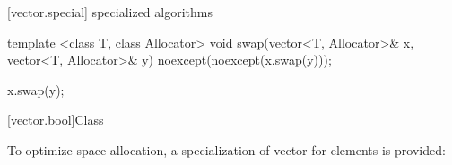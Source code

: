 [vector.special]{ specialized algorithms}

%
%
\begin{itemdecl}
template <class T, class Allocator>
  void swap(vector<T, Allocator>& x, vector<T, Allocator>& y)
    noexcept(noexcept(x.swap(y)));
\end{itemdecl}

\begin{itemdescr}
\pnum
\effects
\begin{codeblock}
x.swap(y);
\end{codeblock}
\end{itemdescr}

[vector.bool]{Class }

\pnum
{}%
To optimize space allocation, a specialization of vector for
elements is provided:

